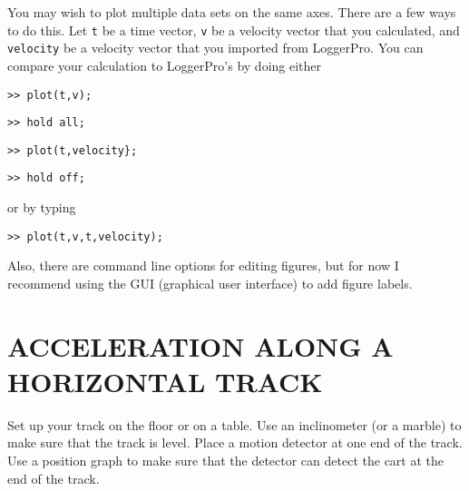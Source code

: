 \documentclass[11pt,letterpaper]{article}
\newcounter{question}[section]
\begin{document}
\begin{itemize}
You may wish to plot multiple data sets on the same axes. There are a few ways to do this. Let \verb+t+ be a time vector, \verb+v+ be a velocity vector that you calculated, and \verb+velocity+ be a velocity vector that you imported from LoggerPro. You can compare your calculation to LoggerPro's by doing either
\begin{verbatim}>> plot(t,v);\end{verbatim}
\begin{verbatim}>> hold all;\end{verbatim}
\begin{verbatim}>> plot(t,velocity};\end{verbatim}
\begin{verbatim}>> hold off;\end{verbatim}
or by typing
\begin{verbatim}>> plot(t,v,t,velocity);\end{verbatim}

Also, there are command line options for editing figures, but for now I recommend using the GUI (graphical user interface) to add figure labels.

\end{itemize}

\section{ACCELERATION ALONG A HORIZONTAL TRACK}
Set up your track on the floor or on a table. Use an inclinometer (or a marble) to make sure that the track is level. Place a motion detector at one end of the track. Use a position graph to make sure that the detector can detect the cart at the end of the track.

\end{document}
